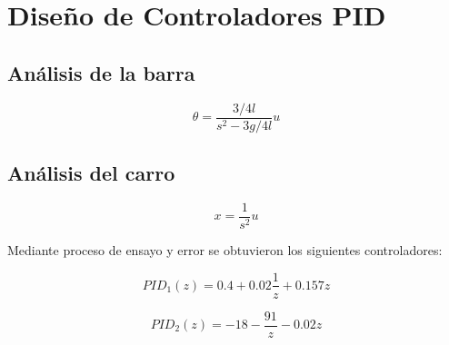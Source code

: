 \section{Diseño de Controladores PID}

\subsection{Análisis de la barra}

\[
\theta = \frac{3/4l}{s^2 - 3g/4l} u
\]

\subsection{Análisis del carro}

\[
x = \frac{1}{s^2} u
\]

Mediante proceso de ensayo y error se obtuvieron los siguientes controladores:

\[
PID_1(z) = 0.4 + 0.02 \frac{1}{z} + 0.157 z
\]

\[
PID_2(z) = -18 - \frac{91}{z} - 0.02 z
\]
